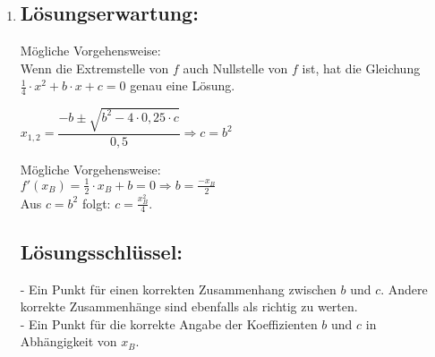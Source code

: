 \begin{langesbeispiel}
{\begin{enumerate}
Die Aussage ist wahr.

Mögliche Begründung:\\
Da $B=(x_B\mid 0)$ ein Extrempunkt von $f$ ist, gilt $f'(x_B)=0$. Weil auch $f(x_B)=0$ ist, ist der Punkt $B$ ein Schnittpunkt der Graphen von $f$ und $f'$.

oder:\\
An einer Stelle, wo die Funktion $f$ eine Extremstelle hat, weist $f'$ eine Nullstelle auf. Da die Extremstelle von $f$ im gegebenen Fall eine Nullstelle ist, haben $f$ und $f'$ die gleiche Nullstelle und somit im Punkt $B$ einen Schnittpunkt.

Mögliche Vorgehensweise:\\
$f'(x)=\frac{1}{2}\cdot x+b \Rightarrow$ Die Steigung der Ableitungsfunktion $f'$ ist $\frac{1}{2}$.\\
$f'(x_t)=\frac{1}{2}\cdot x_t+b=\frac{1}{2} \Rightarrow x_t=1-2\cdot b$

\subsection{Lösungsschlüssel:}
- Ein Punkt für die Angabe, dass die Aussage wahr ist, und eine korrekte Begründung.\\
- Ein Punkt für die richtige Lösung. Äquivalente Ausdrücke sind als richtig zu werten.

\item \subsection{Lösungserwartung:}

Mögliche Vorgehensweise:\\
Wenn die Extremstelle von $f$ auch Nullstelle von $f$ ist, hat die Gleichung $\frac{1}{4}\cdot x^2+b\cdot x+c=0$ genau eine Lösung.

$x_{1,2}=\dfrac{-b\pm\sqrt{b^2-4\cdot 0,25\cdot c}}{0,5} \Rightarrow c=b^2$

Mögliche Vorgehensweise:\\
$f'(x_B)=\frac{1}{2}\cdot x_B+b=0 \Rightarrow b=\frac{-x_B}{2}$\\
Aus $c=b^2$ folgt: $c=\frac{x_B^2}{4}$.

\subsection{Lösungsschlüssel:}
- Ein Punkt für einen korrekten Zusammenhang zwischen $b$ und $c$. Andere korrekte Zusammenhänge sind ebenfalls als richtig zu werten.\\
- Ein Punkt für die korrekte Angabe der Koeffizienten $b$ und $c$ in Abhängigkeit von $x_B$.

\end{enumerate}}
\end{langesbeispiel}